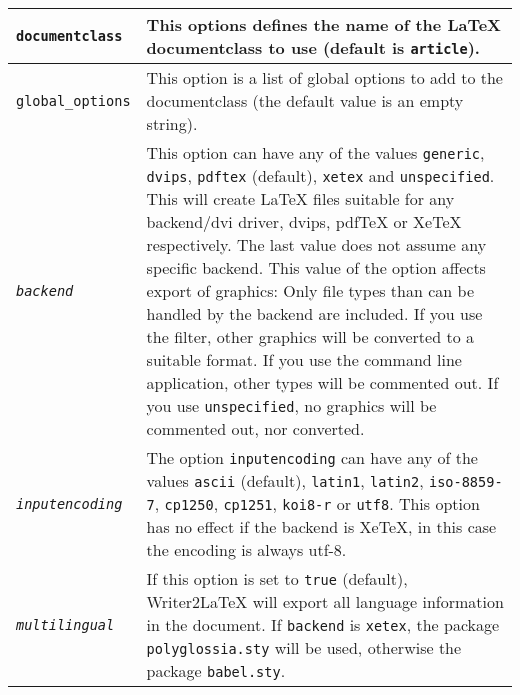 \documentclass{article}
\newcommand\textstyleSourceText[1]{\texttt{\textmd{#1}}}
\begin{document}
\begin{center}
\begin{tabular}{|m{3.425cm}|m{13.188cm}|}

\hline
{\mdseries \textstyleSourceText{documentclass}} &
{\mdseries This options defines the name of the LaTeX documentclass to use (default is \textstyleSourceText{article}).}\\\hline
{\mdseries \textstyleSourceText{global\_options}} &
{\mdseries This option is a list of global options to add to the documentclass (the default value is an empty string).}\\\hline
{\mdseries \textstyleSourceText{\emph{backend}}} &
{\mdseries This option can have any of the values \textstyleSourceText{generic}, \textstyleSourceText{dvips}, \textstyleSourceText{pdftex} (default), \textstyleSourceText{xetex} and \textstyleSourceText{unspecified}. This will create LaTeX files suitable for any backend/dvi driver, dvips, pdfTeX or XeTeX respectively. The last value does not assume any specific backend. This value of the option affects export of graphics: Only file types than can be handled by the backend are included. If you use the filter, other graphics will be converted to a suitable format. If you use the command line application, other types will be commented out. If you use \textstyleSourceText{unspecified}, no graphics will be commented out, nor converted.}\\\hline
{\mdseries \textstyleSourceText{\emph{inputencoding}}} &
{\mdseries The option \textstyleSourceText{inputencoding} can have any of the values \textstyleSourceText{ascii} (default), \textstyleSourceText{latin1}, \textstyleSourceText{latin2}, \textstyleSourceText{iso-8859-7}, \textstyleSourceText{cp1250}, \textstyleSourceText{cp1251}, \textstyleSourceText{koi8-r} or \textstyleSourceText{utf8}. This option has no effect if the backend is XeTeX, in this case the encoding is always utf-8.}\\\hline
{\mdseries \textstyleSourceText{\emph{multilingual}}} &
{\mdseries If this option is set to \textstyleSourceText{true} (default), Writer2LaTeX will export all language information in the document. If \textstyleSourceText{backend} is \textstyleSourceText{xetex}, the package \textstyleSourceText{polyglossia.sty} will be used, otherwise the package \textstyleSourceText{babel.sty}.}


\end{tabular}
\end{center}
\end{document}
